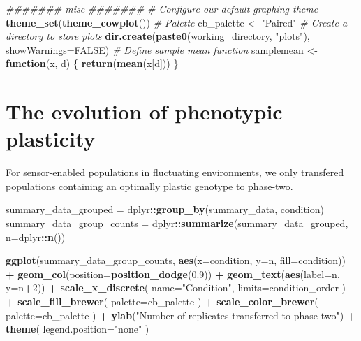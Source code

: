 \documentclass[]{book}
\newenvironment{Shaded}{\begin{snugshade}}{\end{snugshade}}
\newcommand{\CommentTok}[1]{\textcolor[rgb]{0.56,0.35,0.01}{\textit{#1}}}
\newcommand{\ControlFlowTok}[1]{\textcolor[rgb]{0.13,0.29,0.53}{\textbf{#1}}}
\newcommand{\DataTypeTok}[1]{\textcolor[rgb]{0.13,0.29,0.53}{#1}}
\newcommand{\DecValTok}[1]{\textcolor[rgb]{0.00,0.00,0.81}{#1}}
\newcommand{\FloatTok}[1]{\textcolor[rgb]{0.00,0.00,0.81}{#1}}
\newcommand{\KeywordTok}[1]{\textcolor[rgb]{0.13,0.29,0.53}{\textbf{#1}}}
\newcommand{\NormalTok}[1]{#1}
\newcommand{\OperatorTok}[1]{\textcolor[rgb]{0.81,0.36,0.00}{\textbf{#1}}}
\newcommand{\OtherTok}[1]{\textcolor[rgb]{0.56,0.35,0.01}{#1}}
\newcommand{\StringTok}[1]{\textcolor[rgb]{0.31,0.60,0.02}{#1}}
\begin{document}
\begin{Shaded}
\begin{Highlighting}[]
\CommentTok{####### misc #######}
\CommentTok{# Configure our default graphing theme}
\KeywordTok{theme_set}\NormalTok{(}\KeywordTok{theme_cowplot}\NormalTok{())}
\CommentTok{# Palette}
\NormalTok{cb_palette <-}\StringTok{ "Paired"}
\CommentTok{# Create a directory to store plots}
\KeywordTok{dir.create}\NormalTok{(}\KeywordTok{paste0}\NormalTok{(working_directory, }\StringTok{"plots"}\NormalTok{), }\DataTypeTok{showWarnings=}\OtherTok{FALSE}\NormalTok{)}
\CommentTok{# Define sample mean function}
\NormalTok{samplemean <-}\StringTok{ }\ControlFlowTok{function}\NormalTok{(x, d) \{}
  \KeywordTok{return}\NormalTok{(}\KeywordTok{mean}\NormalTok{(x[d]))}
\NormalTok{\}}
\end{Highlighting}
\end{Shaded}

\hypertarget{the-evolution-of-phenotypic-plasticity}{%
\section{The evolution of phenotypic plasticity}\label{the-evolution-of-phenotypic-plasticity}}

For sensor-enabled populations in fluctuating environments, we only transfered populations containing an optimally plastic genotype to phase-two.

\begin{Shaded}
\begin{Highlighting}[]
\NormalTok{summary_data_grouped =}\StringTok{ }\NormalTok{dplyr}\OperatorTok{::}\KeywordTok{group_by}\NormalTok{(summary_data, condition)}
\NormalTok{summary_data_group_counts =}\StringTok{ }\NormalTok{dplyr}\OperatorTok{::}\KeywordTok{summarize}\NormalTok{(summary_data_grouped, }\DataTypeTok{n=}\NormalTok{dplyr}\OperatorTok{::}\KeywordTok{n}\NormalTok{())}

\KeywordTok{ggplot}\NormalTok{(summary_data_group_counts, }\KeywordTok{aes}\NormalTok{(}\DataTypeTok{x=}\NormalTok{condition, }\DataTypeTok{y=}\NormalTok{n, }\DataTypeTok{fill=}\NormalTok{condition)) }\OperatorTok{+}
\StringTok{  }\KeywordTok{geom_col}\NormalTok{(}\DataTypeTok{position=}\KeywordTok{position_dodge}\NormalTok{(}\FloatTok{0.9}\NormalTok{)) }\OperatorTok{+}
\StringTok{  }\KeywordTok{geom_text}\NormalTok{(}\KeywordTok{aes}\NormalTok{(}\DataTypeTok{label=}\NormalTok{n, }\DataTypeTok{y=}\NormalTok{n}\OperatorTok{+}\DecValTok{2}\NormalTok{)) }\OperatorTok{+}
\StringTok{  }\KeywordTok{scale_x_discrete}\NormalTok{(}
    \DataTypeTok{name=}\StringTok{"Condition"}\NormalTok{,}
    \DataTypeTok{limits=}\NormalTok{condition_order}
\NormalTok{  ) }\OperatorTok{+}
\StringTok{  }\KeywordTok{scale_fill_brewer}\NormalTok{(}
    \DataTypeTok{palette=}\NormalTok{cb_palette}
\NormalTok{  ) }\OperatorTok{+}
\StringTok{  }\KeywordTok{scale_color_brewer}\NormalTok{(}
    \DataTypeTok{palette=}\NormalTok{cb_palette}
\NormalTok{  ) }\OperatorTok{+}
\StringTok{  }\KeywordTok{ylab}\NormalTok{(}\StringTok{"Number of replicates transferred to phase two"}\NormalTok{) }\OperatorTok{+}
\StringTok{  }\KeywordTok{theme}\NormalTok{(}
    \DataTypeTok{legend.position=}\StringTok{"none"}
\NormalTok{  )}
\end{Highlighting}
\end{Shaded}
\end{document}
